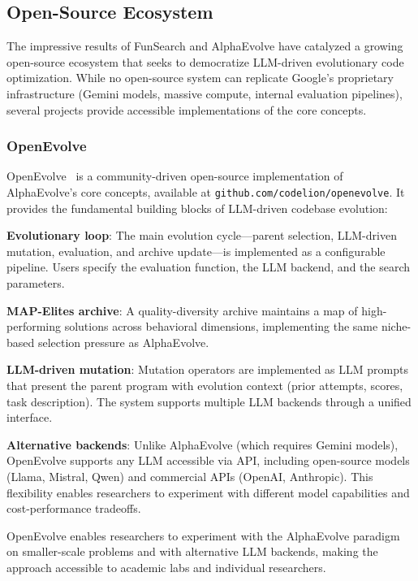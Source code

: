 \subsection{Open-Source Ecosystem}
\label{sec:opensource-evo}

The impressive results of FunSearch and AlphaEvolve have catalyzed a growing open-source ecosystem that seeks to democratize LLM-driven evolutionary code optimization. While no open-source system can replicate Google's proprietary infrastructure (Gemini models, massive compute, internal evaluation pipelines), several projects provide accessible implementations of the core concepts.

\subsubsection{OpenEvolve}

OpenEvolve~\citep{openevolve2025} is a community-driven open-source implementation of AlphaEvolve's core concepts, available at \texttt{github.com/codelion/openevolve}. It provides the fundamental building blocks of LLM-driven codebase evolution:

\textbf{Evolutionary loop}: The main evolution cycle---parent selection, LLM-driven mutation, evaluation, and archive update---is implemented as a configurable pipeline. Users specify the evaluation function, the LLM backend, and the search parameters.

\textbf{MAP-Elites archive}: A quality-diversity archive maintains a map of high-performing solutions across behavioral dimensions, implementing the same niche-based selection pressure as AlphaEvolve.

\textbf{LLM-driven mutation}: Mutation operators are implemented as LLM prompts that present the parent program with evolution context (prior attempts, scores, task description). The system supports multiple LLM backends through a unified interface.

\textbf{Alternative backends}: Unlike AlphaEvolve (which requires Gemini models), OpenEvolve supports any LLM accessible via API, including open-source models (Llama, Mistral, Qwen) and commercial APIs (OpenAI, Anthropic). This flexibility enables researchers to experiment with different model capabilities and cost-performance tradeoffs.

OpenEvolve enables researchers to experiment with the AlphaEvolve paradigm on smaller-scale problems and with alternative LLM backends, making the approach accessible to academic labs and individual researchers.

